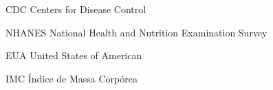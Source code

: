 \documentclass[
	12pt,				%
	oneside,   	        %
	a4paper,			%
	chapter=TITLE,		%
	section=TITLE,		%
	subsection=TITLE,	%
	subsubsection=TITLE,%
	english,			%
	french,				%
	spanish,			%
	brazil,				%
	]{pacotes/abntex2}
\begin{document}
\begin{siglas}
  \item[CDC] Centers for Disease Control
  \item[NHANES] National Health and Nutrition Examination Survey
  \item[EUA] United States of American
  \item[IMC] Índice de Massa Corpórea 
\end{siglas}

\tableofcontents*
\cleardoublepage







  
 
 

\end{document}
